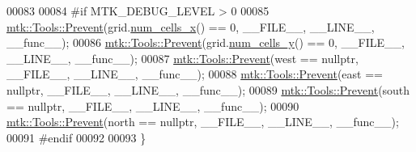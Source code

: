 \begin{DoxyCode}
00083 
00084 \textcolor{preprocessor}{  #if MTK\_DEBUG\_LEVEL > 0}
00085   \hyperlink{classmtk_1_1Tools_afe5bb096309258e2e72503fd7b41c7e0}{mtk::Tools::Prevent}(grid.\hyperlink{classmtk_1_1UniStgGrid2D_a2d182866a398aba8e4829590e85bf939}{num\_cells\_x}() == 0, \_\_FILE\_\_, \_\_LINE\_\_, \_\_func\_\_);
00086   \hyperlink{classmtk_1_1Tools_afe5bb096309258e2e72503fd7b41c7e0}{mtk::Tools::Prevent}(grid.\hyperlink{classmtk_1_1UniStgGrid2D_aed05a801cc9a76dba0ff203cea58a61a}{num\_cells\_y}() == 0, \_\_FILE\_\_, \_\_LINE\_\_, \_\_func\_\_);
00087   \hyperlink{classmtk_1_1Tools_afe5bb096309258e2e72503fd7b41c7e0}{mtk::Tools::Prevent}(west == \textcolor{keyword}{nullptr}, \_\_FILE\_\_, \_\_LINE\_\_, \_\_func\_\_);
00088   \hyperlink{classmtk_1_1Tools_afe5bb096309258e2e72503fd7b41c7e0}{mtk::Tools::Prevent}(east == \textcolor{keyword}{nullptr}, \_\_FILE\_\_, \_\_LINE\_\_, \_\_func\_\_);
00089   \hyperlink{classmtk_1_1Tools_afe5bb096309258e2e72503fd7b41c7e0}{mtk::Tools::Prevent}(south == \textcolor{keyword}{nullptr}, \_\_FILE\_\_, \_\_LINE\_\_, \_\_func\_\_);
00090   \hyperlink{classmtk_1_1Tools_afe5bb096309258e2e72503fd7b41c7e0}{mtk::Tools::Prevent}(north == \textcolor{keyword}{nullptr}, \_\_FILE\_\_, \_\_LINE\_\_, \_\_func\_\_);
00091 \textcolor{preprocessor}{  #endif}
00092 
00093 \}
\end{DoxyCode}
